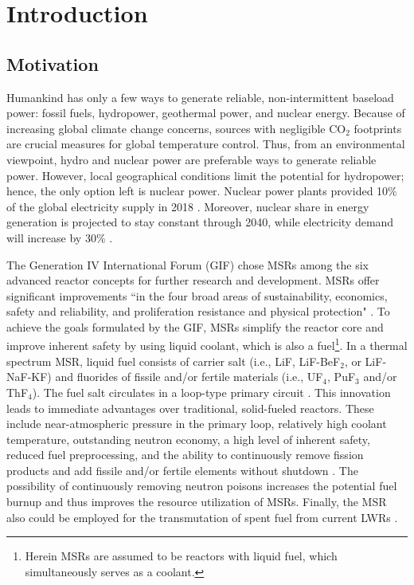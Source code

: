 \chapter{Introduction}
\section{Motivation}
Humankind has only a few ways to generate reliable, non-intermittent baseload 
power: fossil fuels, hydropower, geothermal power, and nuclear energy. 
Because of increasing global climate change concerns, sources with negligible 
CO$_2$ footprints are crucial measures for global temperature control. Thus, 
from an environmental viewpoint, hydro and nuclear power are preferable ways 
to generate reliable power. However,  local geographical conditions limit the 
potential for hydropower; hence, the only option left is nuclear power. 
Nuclear power plants provided 10\% of the global electricity supply in 2018 
\cite{iea_nuclear_2019}. Moreover, nuclear share in energy generation is 
projected to stay constant through 2040, while electricity demand will 
increase by 30\% \cite{noauthor_world_2017}. 

The Generation IV International Forum (GIF) chose \glspl{MSR} among the six 
advanced reactor concepts for further research and development. \glspl{MSR} 
offer significant improvements ``in the four broad areas of sustainability, 
economics, safety and reliability, and proliferation resistance and physical 
protection" \cite{doe_technology_2002}. To achieve the goals formulated by the 
GIF, \glspl{MSR} simplify the reactor core and improve inherent safety by 
using liquid coolant, which is also a fuel\footnote{Herein \glspl{MSR} are 
assumed to be reactors with liquid fuel, which simultaneously serves as a 
coolant.}. In a thermal spectrum \gls{MSR}, liquid fuel consists of carrier 
salt (i.e., LiF, LiF-BeF$_2$, or LiF-NaF-KF) and fluorides of fissile and/or 
fertile materials (i.e., UF$_4$, PuF$_3$ and/or ThF$_4$). The fuel salt 
circulates in a loop-type primary circuit \cite{haubenreich_experience_1970}. 
This innovation leads to immediate advantages over traditional, solid-fueled 
reactors. These include near-atmospheric pressure in the primary loop, 
relatively high coolant temperature, outstanding neutron economy, a high level 
of inherent safety, reduced fuel preprocessing, and the ability to 
continuously remove fission products and add fissile and/or fertile elements 
without shutdown \cite{leblanc_molten_2010}. The possibility of continuously 
removing neutron poisons increases the potential fuel burnup and thus 
improves the resource utilization of \glspl{MSR}. Finally, the \gls{MSR} 
also could be employed for the transmutation of spent fuel from current 
\glspl{LWR} \cite{fratoni_design_2004}.

